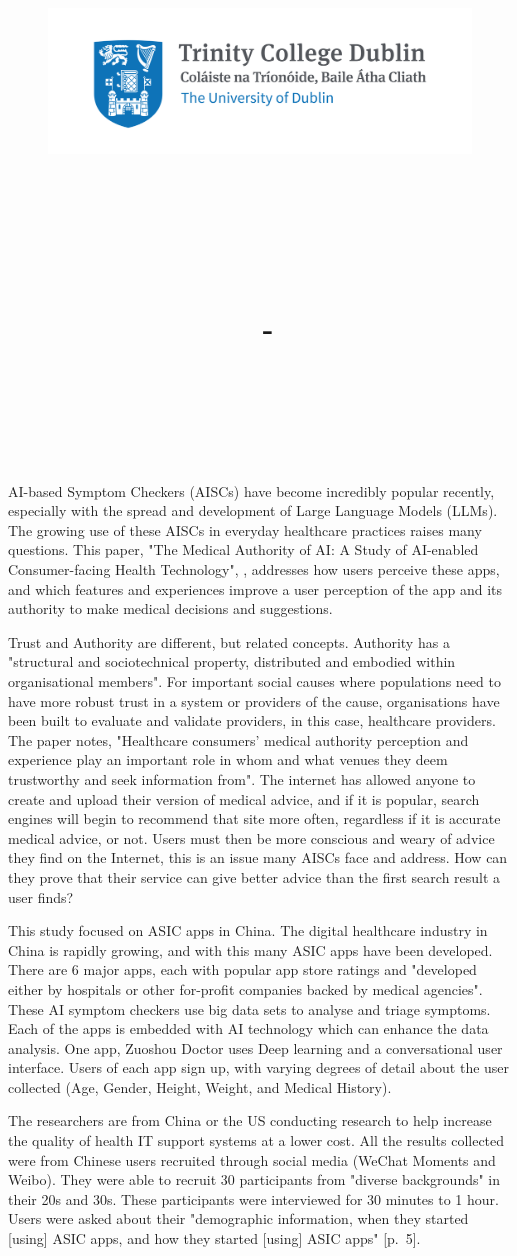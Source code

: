 \documentclass[a4paper]{article}
\title{
    \vspace{-1in}
    \begin{figure}[!ht]
    \flushleft
    \includegraphics[width=0.4\linewidth]{Trinity_RGB_transparent_main.png}
    \end{figure}
    \vspace{-0.5cm}
    \hrulefill \\
    \vspace{1cm}
    \textmd{\textbf{\moduleCode\ \moduleName}}\\
    \textmd{\textbf{\assignmentTitle}}\\
    \textmd{\authorName\ - \authorID}\\
    \textmd{\reportDate}\\
    \vspace{0.5cm}
    \hrulefill \\
}
\date{}
\author{}
\begin{document}
AI-based Symptom Checkers (AISCs) have become incredibly popular recently, especially with the spread and development of Large Language Models (LLMs). The growing use of these AISCs in everyday healthcare practices raises many questions. This paper, "The Medical Authority of AI: A Study of AI-enabled Consumer-facing Health Technology", \cite{YOU_2021}, addresses how users perceive these apps, and which features and experiences improve a user perception of the app and its authority to make medical decisions and suggestions. 

Trust and Authority are different, but related concepts. Authority has a "structural and sociotechnical property, distributed and embodied within organisational members". For important social causes where populations need to have more robust trust in a system or providers of the cause, organisations have been built to evaluate and validate providers, in this case, healthcare providers. The paper notes, "Healthcare consumers' medical authority perception and experience play an important role in whom and what venues they deem trustworthy and seek information from". The internet has allowed anyone to create and upload their version of medical advice, and if it is popular, search engines will begin to recommend that site more often, regardless if it is accurate medical advice, or not. Users must then be more conscious and weary of advice they find on the Internet, this is an issue many AISCs face and address. How can they prove that their service can give better advice than the first search result a user finds?

This study focused on ASIC apps in China. The digital healthcare industry in China is rapidly growing, and with this many ASIC apps have been developed. There are 6 major apps, each with popular app store ratings and "developed either by hospitals or other for-profit companies backed by medical agencies"\cite[p.~4]{YOU_2021}. These AI symptom checkers use big data sets to analyse and triage symptoms. Each of the apps is embedded with AI technology which can enhance the data analysis. One app, Zuoshou Doctor uses Deep learning and a conversational user interface. Users of each app sign up, with varying degrees of detail about the user collected (Age, Gender, Height, Weight, and Medical History). 

The researchers are from China or the US conducting research to help increase the quality of health IT support systems at a lower cost. All the results collected were from Chinese users recruited through social media (WeChat Moments and Weibo). They were able to recruit 30 participants from "diverse backgrounds" in their 20s and 30s. These participants were interviewed for 30 minutes to 1 hour. Users were asked about their "demographic information, when they started [using] ASIC apps, and how they started [using] ASIC apps" \cite{YOU_2021}[p.~5]. 
\end{document}
